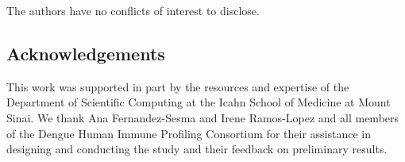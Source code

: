 The authors have no conflicts of interest to disclose.

\subsection*{Acknowledgements}

This work was supported in part by the resources and expertise of the Department of Scientific Computing at the Icahn School of Medicine at Mount Sinai. We thank Ana Fernandez-Sesma and Irene Ramos-Lopez and all members of the Dengue Human Immune Profiling Consortium for their assistance in designing and conducting the study and their feedback on preliminary results.